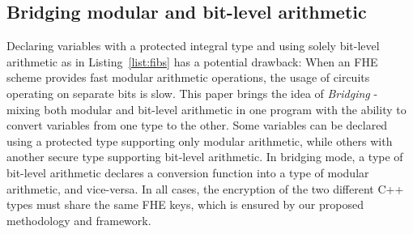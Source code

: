 \subsection{Bridging modular and bit-level arithmetic}\label{ss:bridging}

Declaring variables with a protected integral type and using solely bit-level arithmetic as in Listing~\ref{list:fibs} has a potential drawback: When an FHE scheme provides fast modular arithmetic operations, the usage of circuits operating on separate bits is slow. This paper brings the  idea of 
\textit{Bridging} - mixing both modular and bit-level arithmetic in one program with the ability to convert variables from one type to the other. %
Some variables can be declared using a protected type supporting only modular arithmetic, while others with another secure type supporting bit-level arithmetic. In bridging mode, a type of bit-level arithmetic declares a conversion function into a type of modular arithmetic, and vice-versa.
In all cases, the encryption of the two different C++ types must share the same FHE keys, which is ensured by our proposed methodology and framework. 




